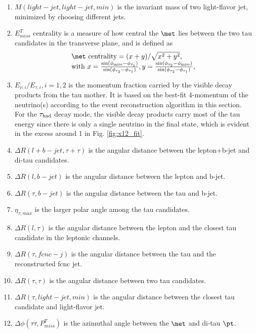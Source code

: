 \begin{enumerate}
\item $M(light-jet,light-jet,min)$ is the invariant mass of two light-flavor jet, minimized by choosing different jets.
\item $E^{T}_{miss}$ centrality is a measure of how central the $\met$ lies between the two tau candidates in the transverse plane, and is defined as
\begin{eqnarray}
\begin{array}{l}
\met~\text{centrality} = {(x+y)}/{\sqrt{x^2+y^2}}, \\
\text{with}~x=\frac{\sin(\phi_{\text{miss}}-\phi_{\tau_1})}{\sin(\phi_{\tau_2}-\phi_{\tau_1})},  y=\frac{\sin(\phi_{\tau_2}-\phi_{\text{miss}})}{\sin(\phi_{\tau_2}-\phi_{\tau_1})} ,
\end{array}
\label{eq:eq3}
\end{eqnarray}
\item $E_{\nu,i}/E_{\tau,i},i=1,2$ is the momentum fraction carried by the visible decay products from the tau mother. It is based on the best-fit 4-momentum of the neutrino(s) according to the event reconstruction algorithm in this section. For the $\tau_\text{had}$ decay mode, the visible decay products carry most of the tau energy since there is only a single neutrino in the final state, which is evident in the excess around 1 in Fig. \ref{fig:x12_fit}. 
\item $\Delta R(l+b-jet,\tau+\tau)$ is the angular distance between the lepton+b-jet and di-tau candidates.
\item $\Delta R(l,b-jet)$ is the angular distance between the lepton and b-jet.
\item $\Delta R(\tau,b-jet)$ is the angular distance between the tau and b-jet.
\item $\eta_{\tau,max}$ is the larger polar angle among the tau candidates.
\item $\Delta R(l,\tau)$ is the angular distance between the lepton and the closest tau candidate in the leptonic channels.
\item $\Delta R(\tau,fcnc-j)$ is the angular distance between the tau and the reconstructed fcnc jet.
\item $\Delta R(\tau,\tau)$ is the angular distance between two tau candidates.
\item $\Delta R(\tau,light-jet,min)$ is the angular distance between the closest tau candidate and light-flavor jet.
\item $\Delta\phi(\tau\tau,P^{T}_{miss})$ is the azimuthal angle between the $\met$ and di-tau $\pt$.

\end{enumerate}
